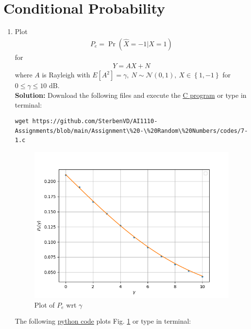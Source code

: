 \documentclass[journal,12pt,twocolumn]{IEEEtran}
\numberwithin{equation}{section}
\renewcommand\thesection{\arabic{section}}
\providecommand{\pr}[1]{\ensuremath{\Pr\left(#1\right)}}
\providecommand{\sbrak}[1]{\ensuremath{{}\left[#1\right]}}
\providecommand{\cbrak}[1]{\ensuremath{\left\{#1\right\}}}
\providecommand{\gauss}[2]{\mathcal{N}\ensuremath{\left(#1,#2\right)}}
\providecommand{\gitlink}[2]{{\color{blue}\href{https://github.com/SterbenVD/AI1110-Assignments/blob/main/Assignment\%20-\%20Random\%20Numbers/#1}{#2}}}
\newcommand{\solution}{\noindent \textbf{\\ Solution: }}
\begin{document}
\section{Conditional Probability}
\begin{enumerate}[label=\thesection.\arabic*
        ,ref=\thesection.\theenumi]
    \item Plot
          \begin{align}
              P_e = \pr{\hat{X} = -1|X = 1}
          \end{align}
          for
          \begin{align}
              Y = AX + N
          \end{align}
          where $A$ is Rayleigh with $E\sbrak{A^2} = \gamma,\ N \sim \gauss{0}{1},\ X \in \cbrak{1, -1}$ for $0 \leq \gamma \leq 10 \text{ dB}$.
          \solution Download the following files and execute the \gitlink{codes/7-1.c}{C program} or type in terminal:
          \begin{lstlisting}
wget https://github.com/SterbenVD/AI1110-Assignments/blob/main/Assignment\%20-\%20Random\%20Numbers/codes/7-1.c
                    \end{lstlisting}
          \begin{figure}[H]
              \centering
              \includegraphics[width = \columnwidth]{../figs/7-1.png}
              \caption{Plot of $P_e$ wrt $\gamma$}
              \label{fig:7-1}
          \end{figure}
          The following \gitlink{codes/7-1.py}{python code} plots Fig. \ref{fig:7-1} or type in terminal:
          \begin{lstlisting}

\end{lstlisting}
\end{enumerate}
\end{document}

